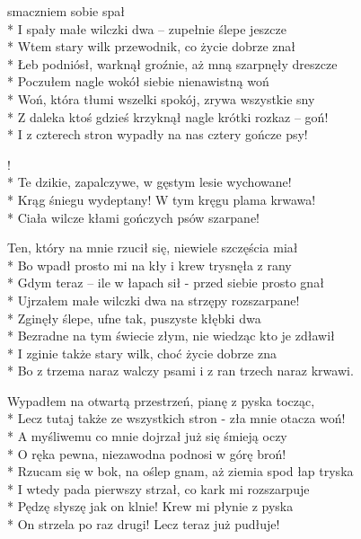 \begin{lyrics}[longestline={Bo z trzema naraz walczy psami i z ran trzech naraz krwawi.}]

 smaczniem sobie spał\\*
I spały małe wilczki dwa -- zupełnie ślepe jeszcze\\*
Wtem stary wilk przewodnik, co życie dobrze znał\\*
Łeb podniósł, warknął groźnie, aż mną szarpnęły dreszcze\\*
Poczułem nagle wokół siebie nienawistną woń\\*
Woń, która tłumi wszelki spokój, zrywa wszystkie sny\\*
Z daleka ktoś gdzieś krzyknął nagle krótki rozkaz -- goń!\\*
I z czterech stron wypadły na nas cztery gończe psy!

\begin{chorus}
!\\*
Te dzikie, zapalczywe, w gęstym lesie wychowane!\\*
Krąg śniegu wydeptany! W tym kręgu plama krwawa!\\*
Ciała wilcze kłami gończych psów szarpane!
\end{chorus}

Ten, który na mnie rzucił się, niewiele szczęścia miał\\*
Bo wpadł prosto mi na kły i krew trysnęła z rany\\*
Gdym teraz -- ile w łapach sił - przed siebie prosto gnał\\*
Ujrzałem małe wilczki dwa na strzępy rozszarpane!\\*
Zginęły ślepe, ufne tak, puszyste kłębki dwa\\*
Bezradne na tym świecie złym, nie wiedząc kto je zdławił\\*
I zginie także stary wilk, choć życie dobrze zna\\*
Bo z trzema naraz walczy psami i z ran trzech naraz krwawi.

\chorusref

\breaklyrics

Wypadłem na otwartą przestrzeń, pianę z pyska tocząc,\\*
Lecz tutaj także ze wszystkich stron - zła mnie otacza woń!\\*
A myśliwemu co mnie dojrzał już się śmieją oczy\\*
O ręka pewna, niezawodna podnosi w górę broń!\\*
Rzucam się w bok, na oślep gnam, aż ziemia spod łap tryska\\*
I wtedy pada pierwszy strzał, co kark mi rozszarpuje\\*
Pędzę słyszę jak on klnie! Krew mi płynie z pyska\\*
On strzela po raz drugi! Lecz teraz już pudłuje!


\end{lyrics}
